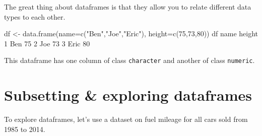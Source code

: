 \documentclass[
]{book}
\newenvironment{Shaded}{\begin{snugshade}}{\end{snugshade}}
\newcommand{\AttributeTok}[1]{\textcolor[rgb]{0.77,0.63,0.00}{#1}}
\newcommand{\DecValTok}[1]{\textcolor[rgb]{0.00,0.00,0.81}{#1}}
\newcommand{\FunctionTok}[1]{\textcolor[rgb]{0.00,0.00,0.00}{#1}}
\newcommand{\NormalTok}[1]{#1}
\newcommand{\OtherTok}[1]{\textcolor[rgb]{0.56,0.35,0.01}{#1}}
\newcommand{\StringTok}[1]{\textcolor[rgb]{0.31,0.60,0.02}{#1}}
\begin{document}
The great thing about dataframes is that they allow you to relate different data types to each other.

\begin{Shaded}
\begin{Highlighting}[]
\NormalTok{df }\OtherTok{\textless{}{-}} \FunctionTok{data.frame}\NormalTok{(}\AttributeTok{name=}\FunctionTok{c}\NormalTok{(}\StringTok{"Ben"}\NormalTok{,}\StringTok{"Joe"}\NormalTok{,}\StringTok{"Eric"}\NormalTok{),}
                 \AttributeTok{height=}\FunctionTok{c}\NormalTok{(}\DecValTok{75}\NormalTok{,}\DecValTok{73}\NormalTok{,}\DecValTok{80}\NormalTok{))}
\NormalTok{df}
\NormalTok{  name height}
\DecValTok{1}\NormalTok{  Ben     }\DecValTok{75}
\DecValTok{2}\NormalTok{  Joe     }\DecValTok{73}
\DecValTok{3}\NormalTok{ Eric     }\DecValTok{80}
\end{Highlighting}
\end{Shaded}

This dataframe has one column of class \texttt{character} and another of class \texttt{numeric}.

\hypertarget{subsetting-exploring-dataframes}{%
\section*{Subsetting \& exploring dataframes}\label{subsetting-exploring-dataframes}}

To explore dataframes, let's use a dataset on fuel mileage for all cars sold from 1985 to 2014.
\end{document}
